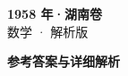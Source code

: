 \documentclass[zihao=-4, a4paper]{ctexart}
\begin{document}
\begin{center}
  {\Large\bfseries 1958 年·湖南卷}\\[4pt]
  {\large 数学 · 解析版}
\end{center}
\medskip
{}

\clearpage
{}
\begin{center}{\Large\bfseries 参考答案与详细解析}\end{center}
\medskip

\end{document}
